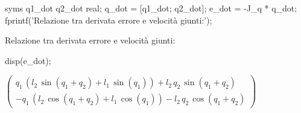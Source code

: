 \documentclass[11pt, a4paper]{article}
\begin{document}
\begin{matlabcode}
syms q1_dot q2_dot real;
q_dot = [q1_dot; q2_dot];
e_dot = -J_q * q_dot;
fprintf('Relazione tra derivata errore e velocità giunti:');
\end{matlabcode}
\begin{matlaboutput}
Relazione tra derivata errore e velocità giunti:
\end{matlaboutput}
\begin{matlabcode}
disp(e_dot);
\end{matlabcode}
\begin{matlabsymbolicoutput}
$\displaystyle \left(\begin{array}{c}
q_{\dot{1} } \,{\left(l_2 \,\sin \left(q_1 +q_2 \right)+l_1 \,\sin \left(q_1 \right)\right)}+l_2 \,q_{\dot{2} } \,\sin \left(q_1 +q_2 \right)\\
-q_{\dot{1} } \,{\left(l_2 \,\cos \left(q_1 +q_2 \right)+l_1 \,\cos \left(q_1 \right)\right)}-l_2 \,q_{\dot{2} } \,\cos \left(q_1 +q_2 \right)
\end{array}\right)$
\end{matlabsymbolicoutput}
\end{document}
